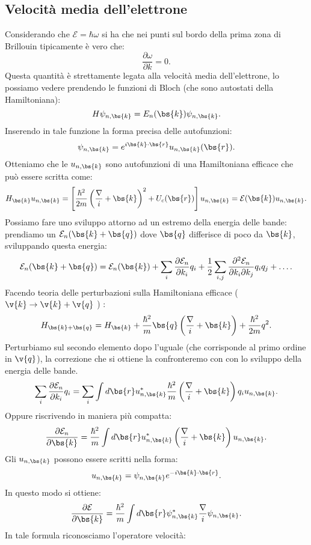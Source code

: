 \subsection{Velocità media dell'elettrone}
\label{subsec:Velocità media dell'elettrone}
Considerando che $\mathcal{E}  = \hbar \omega $ si ha che nei punti sul bordo della prima zona di Brillouin tipicamente è vero che: 
\[
	\frac{\partial \omega }{\partial k} = 0
.\] 
Questa quantità è strettamente legata alla velocità media dell'elettrone, lo possiamo vedere prendendo le funzioni di Bloch (che sono autostati della Hamiltoniana):
\[
	H\psi_{n,\bs{k}} = E_n(\bs{k})\psi_{n,\bs{k}}
.\] 
Inserendo in tale funzione la forma precisa delle autofunzioni:
\[
	\psi_{n,\bs{k}} = e^{i\bs{k}\cdot\bs{r}} u_{n,\bs{k}}(\bs{r})
.\] 
Otteniamo che le $u_{n,\bs{k}}$ sono autofunzioni di una Hamiltoniana efficace che può essere scritta come:
\[
	H_{\bs{k}} u_{n,\bs{k}} = 
	\left[ \frac{\hbar ^2}{2m}\left( \frac{\nabla}{i} + \bs{k} \right)^2 
	+U_c(\bs{r})\right] u_{n,\bs{k}} = \mathcal{E}(\bs{k})u_{n,\bs{k}}
.\] 
Possiamo fare uno sviluppo attorno ad un estremo della energia delle bande: prendiamo un $\mathcal{E}_n(\bs{k}+\bs{q})$ dove $\bs{q}$ differisce di poco da $\bs{k}$, sviluppando questa energia:
\[
	\mathcal{E}_n(\bs{k}+\bs{q}) =
	\mathcal{E}_n(\bs{k})+
	\sum_{i}^{} \frac{\partial \mathcal{E}_n}{\partial k_i} q_i +
	\frac{1}{2}\sum_{i,j}^{} \frac{\partial ^2 \mathcal{E}_n}
	{\partial k_i \partial  k_j} q_i q_j+ \ldots
.\] 
Facendo teoria delle perturbazioni sulla Hamiltoniana efficace ($\v{k}\to \v{k}+\v{q}$ ) :
\[
	H_{\bs{k}+\bs{q}}
	=
	H_{\bs{k}} +
	\frac{\hbar ^2}{m}\bs{q}\left( \frac{\nabla}{i}+\bs{k} \right) 
	+
	\frac{\hbar ^2}{2m} q^2
.\]
Perturbiamo sul secondo elemento dopo l'uguale (che corrisponde al primo ordine in $\v{q}$), la correzione che si ottiene la confronteremo con con lo sviluppo della energia delle bande.
\[
	\sum_{i}^{} \frac{\partial \mathcal{E}_n}{\partial k_i}q_i=
	\sum_{i}^{} \int d\bs{r} u_{n,\bs{k}}^* \frac{\hbar ^2}{m}
	\left( \frac{\nabla}{i} + \bs{k} \right)q_i u_{n,\bs{k}}
.\] 
Oppure riscrivendo in maniera più compatta:
\[
	\frac{\partial \mathcal{E}_n}{\partial \bs{k}} =
	\frac{\hbar ^2}{m} \int d \bs{r} u_{n,\bs{k}}^* 
	\left( \frac{\nabla}{i} + \bs{k} \right) u_{n,\bs{k}}
.\] 
Gli $u_{n,\bs{k}}$ possono essere scritti nella forma:
\[
	u_{n,\bs{k}} = \psi_{n,\bs{k}} e^{-i \bs{k}\cdot\bs{r}}
.\] 
In questo modo si ottiene:
\[
	\frac{\partial \mathcal{E}}{\partial \bs{k}} =
	\frac{\hbar ^2}{m} \int d \bs{r} \psi_{n,\bs{k}}^* \frac{\nabla}{i} \psi_{n,\bs{k}}
.\]
In tale formula riconosciamo l'operatore velocità:
